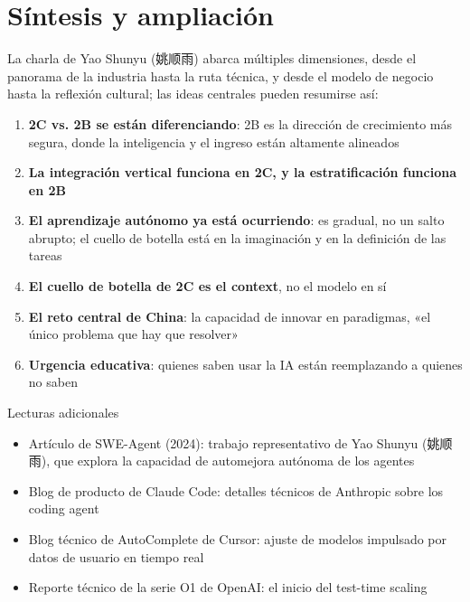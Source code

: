 \section{Síntesis y ampliación}

La charla de Yao Shunyu (姚顺雨) abarca múltiples dimensiones, desde el panorama de la industria hasta la ruta técnica, y desde el modelo de negocio hasta la reflexión cultural; las ideas centrales pueden resumirse así:

\begin{enumerate}
\item \textbf{2C vs. 2B se están diferenciando}: 2B es la dirección de crecimiento más segura, donde la inteligencia y el ingreso están altamente alineados
\item \textbf{La integración vertical funciona en 2C, y la estratificación funciona en 2B}
\item \textbf{El aprendizaje autónomo ya está ocurriendo}: es gradual, no un salto abrupto; el cuello de botella está en la imaginación y en la definición de las tareas
\item \textbf{El cuello de botella de 2C es el context}, no el modelo en sí
\item \textbf{El reto central de China}: la capacidad de innovar en paradigmas, «el único problema que hay que resolver»
\item \textbf{Urgencia educativa}: quienes saben usar la IA están reemplazando a quienes no saben
\end{enumerate}

\begin{knowledgebox}{Lecturas adicionales}
\begin{itemize}
\item Artículo de SWE-Agent (2024): trabajo representativo de Yao Shunyu (姚顺雨), que explora la capacidad de automejora autónoma de los agentes
\item Blog de producto de Claude Code: detalles técnicos de Anthropic sobre los coding agent
\item Blog técnico de AutoComplete de Cursor: ajuste de modelos impulsado por datos de usuario en tiempo real
\item Reporte técnico de la serie O1 de OpenAI: el inicio del test-time scaling
\end{itemize}
\end{knowledgebox}



